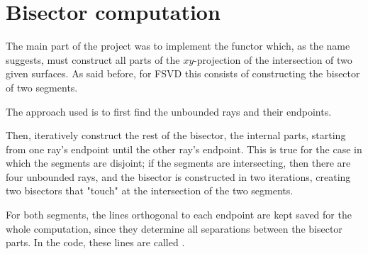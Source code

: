 \documentclass[11pt,a4paper,english]{article}
\begin{document}
	

	\section{Bisector computation}
	The main part of the project was to implement the functor  which, as the name suggests, must construct all parts of the \(xy\)-projection of the intersection of two given surfaces. As said before, for FSVD this consists of constructing the bisector of two segments.\par
	The approach used is to first find the unbounded rays and their endpoints.\par
	Then, iteratively construct the rest of the bisector, the internal parts, starting from one ray's endpoint until the other ray's endpoint.
	This is true for the case in which the segments are disjoint; if the segments are intersecting, then there are four unbounded rays, and the bisector is constructed in two iterations, creating two bisectors that "touch" at the intersection of the two segments.\ppar
	
	For both segments, the lines orthogonal to each endpoint are kept saved for the whole computation, since they determine all separations between the bisector parts. In the code, these lines are called .
	
\end{document}
